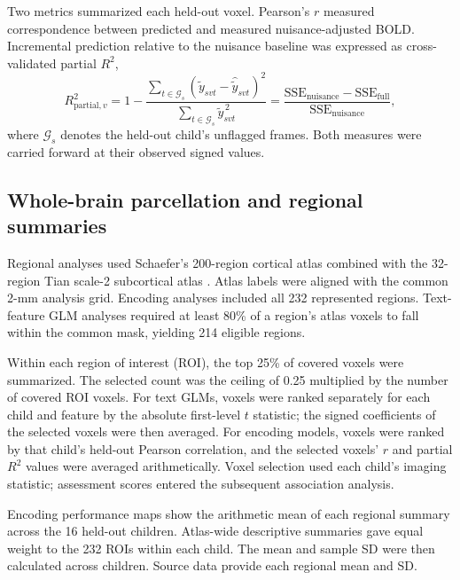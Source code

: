 Two metrics summarized each held-out voxel. Pearson's $r$ measured correspondence between predicted and measured nuisance-adjusted BOLD. Incremental prediction relative to the nuisance baseline was expressed as cross-validated partial $R^2$,
\begin{equation}
 R^2_{\mathrm{partial},v}
 =1-\frac{\sum_{t\in\mathcal{G}_s}(\widetilde y_{svt}-\widehat{\widetilde y}_{svt})^2}
 {\sum_{t\in\mathcal{G}_s}\widetilde y_{svt}^{\,2}}
 =\frac{\mathrm{SSE}_{\mathrm{nuisance}}-\mathrm{SSE}_{\mathrm{full}}}
 {\mathrm{SSE}_{\mathrm{nuisance}}},
\end{equation}
where $\mathcal{G}_s$ denotes the held-out child's unflagged frames. Both measures were carried forward at their observed signed values.

\subsection{Whole-brain parcellation and regional summaries}
Regional analyses used Schaefer's 200-region cortical atlas combined with the 32-region Tian scale-2 subcortical atlas \cite{schaefer,tian}. Atlas labels were aligned with the common 2-mm analysis grid. Encoding analyses included all 232 represented regions. Text-feature GLM analyses required at least 80\% of a region's atlas voxels to fall within the common mask, yielding 214 eligible regions.

Within each region of interest (ROI), the top 25\% of covered voxels were summarized. The selected count was the ceiling of 0.25 multiplied by the number of covered ROI voxels. For text GLMs, voxels were ranked separately for each child and feature by the absolute first-level $t$ statistic; the signed coefficients of the selected voxels were then averaged. For encoding models, voxels were ranked by that child's held-out Pearson correlation, and the selected voxels' $r$ and partial $R^2$ values were averaged arithmetically. Voxel selection used each child's imaging statistic; assessment scores entered the subsequent association analysis.

Encoding performance maps show the arithmetic mean of each regional summary across the 16 held-out children. Atlas-wide descriptive summaries gave equal weight to the 232 ROIs within each child. The mean and sample SD were then calculated across children. Source data provide each regional mean and SD.

